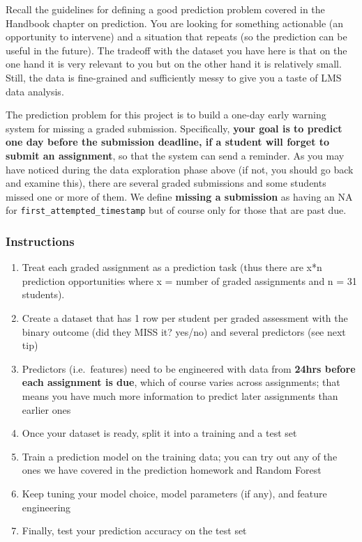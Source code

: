 \documentclass[
]{article}
\providecommand{\tightlist}{%
  \setlength{\itemsep}{0pt}\setlength{\parskip}{0pt}}
\begin{document}
Recall the guidelines for defining a good prediction problem covered in
the Handbook chapter on prediction. You are looking for something
actionable (an opportunity to intervene) and a situation that repeats
(so the prediction can be useful in the future). The tradeoff with the
dataset you have here is that on the one hand it is very relevant to you
but on the other hand it is relatively small. Still, the data is
fine-grained and sufficiently messy to give you a taste of LMS data
analysis.

The prediction problem for this project is to build a one-day early
warning system for missing a graded submission. Specifically,
\textbf{your goal is to predict one day before the submission deadline,
if a student will forget to submit an assignment}, so that the system
can send a reminder. As you may have noticed during the data exploration
phase above (if not, you should go back and examine this), there are
several graded submissions and some students missed one or more of them.
We define \textbf{missing a submission} as having an NA for
\texttt{first\_attempted\_timestamp} but of course only for those that
are past due.

\hypertarget{instructions}{%
\subsubsection{Instructions}\label{instructions}}

\begin{enumerate}
\def\labelenumi{\arabic{enumi}.}
\tightlist
\item
  Treat each graded assignment as a prediction task (thus there are x*n
  prediction opportunities where x = number of graded assignments and n
  = 31 students).
\item
  Create a dataset that has 1 row per student per graded assessment with
  the binary outcome (did they MISS it? yes/no) and several predictors
  (see next tip)
\item
  Predictors (i.e.~features) need to be engineered with data from
  \textbf{24hrs before each assignment is due}, which of course varies
  across assignments; that means you have much more information to
  predict later assignments than earlier ones
\item
  Once your dataset is ready, split it into a training and a test set
\item
  Train a prediction model on the training data; you can try out any of
  the ones we have covered in the prediction homework and Random Forest
\item
  Keep tuning your model choice, model parameters (if any), and feature
  engineering
\item
  Finally, test your prediction accuracy on the test set
\end{enumerate}
\end{document}
